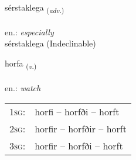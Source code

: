 \documentclass[frontgrid, backgrid]{flacards}\usepackage[]{graphicx}\usepackage[]{xcolor}
\begin{document}

\renewcommand{\flhead}{\vskip5pt \fboxsep=0pt {\small\bfseries\footnotesize Atviksorð | Adverb}}
\renewcommand{\fcfoot}{\vskip5pt \fboxsep=0pt \hspace{2pt}{\small\bfseries\footnotesize 1K}}

\renewcommand{\blhead}{\vskip5pt {\small\bfseries\footnotesize Atviksorð | Adverb }}
\renewcommand{\bcfoot}{\vskip5pt \hspace{2pt}{\small\bfseries\footnotesize 1K}}


{sérstaklega \small{\textsubscript{(\textit{adv.})}} \\[1ex]
 \\
en.: \emph{especially} \\  [2ex]
sérstaklega (Indeclinable)}

\renewcommand{\flhead}{\vskip5pt \fboxsep=0pt {\small\bfseries\footnotesize Sagnorð | Verb}}
\renewcommand{\fcfoot}{\vskip5pt \fboxsep=0pt \hspace{2pt}{\small\bfseries\footnotesize 1K}}

\renewcommand{\blhead}{\vskip5pt {\small\bfseries\footnotesize Sagnorð | Verb }}
\renewcommand{\bcfoot}{\vskip5pt \hspace{2pt}{\small\bfseries\footnotesize 1K}}


{horfa \small{\textsubscript{(\textit{v.})}} \\[1ex] %
\textphonetic{[hɔrva]} \\
en.: \emph{watch} \\  [2ex]
\renewcommand*{\arraystretch}{0.8}
\begin{tabular}{p{1cm}l}
\textsc{1sg}: & horfi -- horfði -- horft \\ 
\textsc{2sg}: & horfir -- horfðir -- horft \\ 
\textsc{3sg}: & horfir -- horfði -- horft \\ 
\end{tabular}
}
\end{document}
